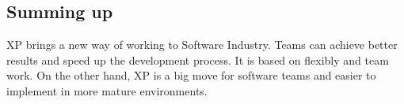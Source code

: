 \documentclass[conference]{IEEEtran}
\begin{document}
\subsection{Summing up}
XP brings a new way of working to Software Industry. Teams can achieve better results and speed up the development process. It is based on flexibly and team work. On the other hand, XP is a big move for software teams and easier to implement in more mature environments. 

%
%



%
%
\end{document}
